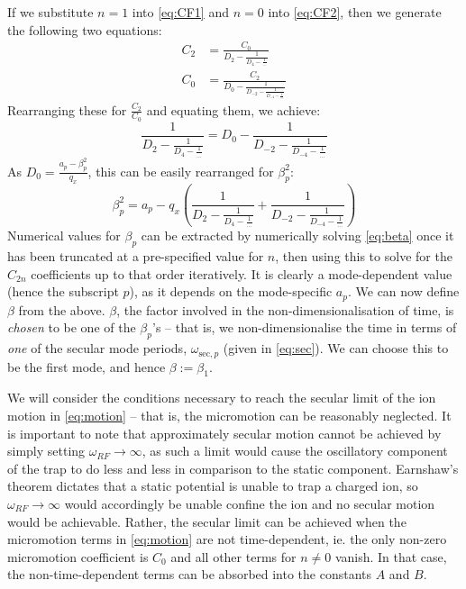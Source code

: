\documentclass{article}
\begin{document}
\medskip
\noindent If we substitute $n = 1$ into \eqref{eq:CF1} and $n = 0$ into \eqref{eq:CF2}, then we generate the following two equations:
\begin{align}
C_2 & = \frac{C_0}{D_2 - \frac{1}{D_4 - \frac{1}{\dots}}} \\
C_0 & = \frac{C_2}{D_0 - \frac{1}{D_{-2} - \frac{1}{D_{-4} - \frac{1}{\dots}}}}
\end{align}
Rearranging these for $\frac{C_2}{C_0}$ and equating them, we achieve:
\begin{equation}
\frac{1}{D_2 - \frac{1}{D_4 - \frac{1}{\dots}}}	= D_0 - \frac{1}{D_{-2} - \frac{1}{D_{-4} - \frac{1}{\dots}}}
\end{equation}
As $D_0 = \frac{a_p - \beta_p^2}{q_x}$, this can be easily rearranged for $\beta_p^2$:
\begin{equation}
\beta_p^2 = a_p - q_x \left( \frac{1}{D_2 - \frac{1}{D_4 - \frac{1}{\dots}}} + \frac{1}{D_{-2} - \frac{1}{D_{-4} - \frac{1}{\dots}}} \right) \label{eq:beta}
\end{equation}
Numerical values for $\beta_p$ can be extracted by numerically solving \eqref{eq:beta} once it has been truncated at a pre-specified value for $n$, then using this to solve for the $C_{2n}$ coefficients up to that order iteratively. It is clearly a mode-dependent value (hence the subscript $p$), as it depends on the mode-specific $a_p$. We can now define $\beta$ from the above. $\beta$, the factor involved in the non-dimensionalisation of time, is \textit{chosen} to be one of the $\beta_p$'s -- that is, we non-dimensionalise the time in terms of \textit{one} of the secular mode periods, $\omega_{\text{sec},p}$ (given in \eqref{eq:sec}). We can choose this to be the first mode, and hence $\beta := \beta_1$. \par
\medskip
\noindent We will consider the conditions necessary to reach the secular limit of the ion motion in \eqref{eq:motion} -- that is, the micromotion can be reasonably neglected. It is important to note that approximately secular motion cannot be achieved by simply setting $\omega_{RF} \rightarrow \infty$, as such a limit would cause the oscillatory component of the trap to do less and less in comparison to the static component. Earnshaw's theorem dictates that a static potential is unable to trap a charged ion, so $\omega_{RF} \rightarrow \infty$ would accordingly be unable confine the ion and no secular motion would be achievable. Rather, the secular limit can be achieved when the micromotion terms in \eqref{eq:motion} are not time-dependent, ie. the only non-zero micromotion coefficient is $C_0$ and all other terms for $n \neq 0$ vanish. In that case, the non-time-dependent terms can be absorbed into the constants $A$ and $B$. \par
\end{document}
